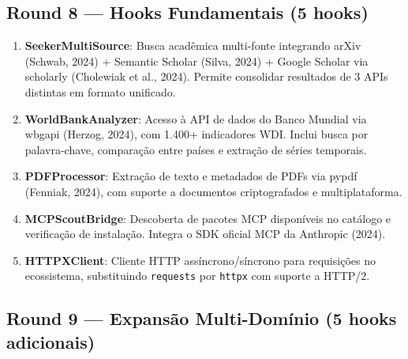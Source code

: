\documentclass[12pt,a4paper]{article}
\begin{document}
\subsection{Round 8 — Hooks Fundamentais (5 hooks)}

\begin{enumerate}
  \item \textbf{SeekerMultiSource}: Busca acadêmica multi-fonte integrando arXiv (Schwab, 2024) + Semantic Scholar (Silva, 2024) + Google Scholar via scholarly (Cholewiak et al., 2024). Permite consolidar resultados de 3 APIs distintas em formato unificado.
  
  \item \textbf{WorldBankAnalyzer}: Acesso à API de dados do Banco Mundial via wbgapi (Herzog, 2024), com 1.400+ indicadores WDI. Inclui busca por palavra-chave, comparação entre países e extração de séries temporais.

  \item \textbf{PDFProcessor}: Extração de texto e metadados de PDFs via pypdf (Fenniak, 2024), com suporte a documentos criptografados e multiplataforma.

  \item \textbf{MCPScoutBridge}: Descoberta de pacotes MCP disponíveis no catálogo e verificação de instalação. Integra o SDK oficial MCP da Anthropic (2024).

  \item \textbf{HTTPXClient}: Cliente HTTP assíncrono/síncrono para requisições no ecossistema, substituindo \texttt{requests} por \texttt{httpx} com suporte a HTTP/2.
\end{enumerate}

\subsection{Round 9 — Expansão Multi-Domínio (5 hooks adicionais)}
\end{document}
